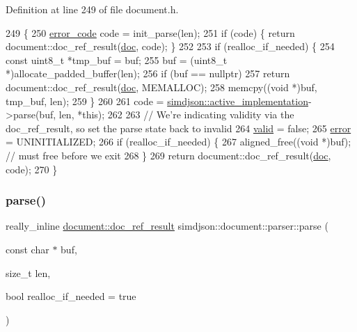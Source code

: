 Definition at line 249 of file document.\+h.


\begin{DoxyCode}
249                                                                                                            
              \{
250   \hyperlink{namespacesimdjson_a7b735a3a50ba79e3f7f14df5f77d8da9}{error\_code} code = init\_parse(len);
251   \textcolor{keywordflow}{if} (code) \{ \textcolor{keywordflow}{return} document::doc\_ref\_result(\hyperlink{classsimdjson_1_1document_1_1parser_a689e8f23f1e1b63f9e8a3c68ad9517a2}{doc}, code); \}
252 
253   \textcolor{keywordflow}{if} (realloc\_if\_needed) \{
254     \textcolor{keyword}{const} uint8\_t *tmp\_buf = buf;
255     buf = (uint8\_t *)allocate\_padded\_buffer(len);
256     \textcolor{keywordflow}{if} (buf == \textcolor{keyword}{nullptr})
257       \textcolor{keywordflow}{return} document::doc\_ref\_result(\hyperlink{classsimdjson_1_1document_1_1parser_a689e8f23f1e1b63f9e8a3c68ad9517a2}{doc}, MEMALLOC);
258     memcpy((\textcolor{keywordtype}{void} *)buf, tmp\_buf, len);
259   \}
260 
261   code = \hyperlink{namespacesimdjson_a9ed6efb6da2dda95f75256aaf1d0b9b4}{simdjson::active\_implementation}->parse(buf, len, *\textcolor{keyword}{this});
262 
263   \textcolor{comment}{// We're indicating validity via the doc\_ref\_result, so set the parse state back to invalid}
264   \hyperlink{classsimdjson_1_1document_1_1parser_a1aaf05806149d370d15140125038d3b2}{valid} = \textcolor{keyword}{false};
265   \hyperlink{classsimdjson_1_1document_1_1parser_afa18e48f1df491d56afdfea2fa353e05}{error} = UNINITIALIZED;
266   \textcolor{keywordflow}{if} (realloc\_if\_needed) \{
267     aligned\_free((\textcolor{keywordtype}{void} *)buf); \textcolor{comment}{// must free before we exit}
268   \}
269   \textcolor{keywordflow}{return} document::doc\_ref\_result(\hyperlink{classsimdjson_1_1document_1_1parser_a689e8f23f1e1b63f9e8a3c68ad9517a2}{doc}, code);
270 \}
\end{DoxyCode}
\mbox{\label{classsimdjson_1_1document_1_1parser_a1ce12050358a969596ced70f9786c1cc}} 
\subsubsection{\texorpdfstring{parse()}{parse()}\hspace{0.1cm}{\footnotesize\ttfamily [2/4]}}
{\footnotesize\ttfamily really\+\_\+inline \hyperlink{classsimdjson_1_1document_1_1doc__ref__result}{document\+::doc\+\_\+ref\+\_\+result} simdjson\+::document\+::parser\+::parse (\begin{DoxyParamCaption}\item[{const char $\ast$}]{buf,  }\item[{size\+\_\+t}]{len,  }\item[{bool}]{realloc\+\_\+if\+\_\+needed = {\ttfamily true} }\end{DoxyParamCaption})\hspace{0.3cm}{\ttfamily [noexcept]}}



